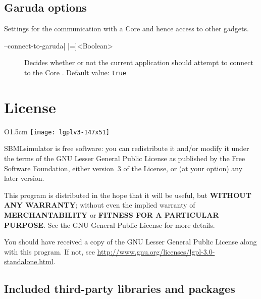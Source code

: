 \section{Garuda options}
Settings for the communication with a \Garuda Core and hence access to other \Garuda gadgets.
\begin{description}
\item[--connect-to-garuda{[} |={]}<Boolean>]
          Decides whether or not the current application should attempt
          to connect to the \Garuda Core \citep{Ghosh2011}.
          Default value: \texttt{true}
\end{description}
\renewcommand{\descriptionlabel}[1]{\textcolor{black}{\textbf{#1}}}

\chapter{License}

\begin{wrapfigure}{O}{1.5cm}
\vspace{\wrapfigspace}
\texttt{[image: lgplv3-147x51]}
\end{wrapfigure}
SBMLsimulator is free software: you can redistribute it and/or modify it under the terms of the GNU Lesser General Public License as published by the Free Software Foundation, either version~3 of the License, or (at your option) any later version.

This program is distributed in the hope that it will be useful, but \textbf{WITHOUT ANY WARRANTY}; without even the implied warranty of \textbf{MERCHANTABILITY} or \textbf{FITNESS FOR A PARTICULAR PURPOSE}. See the GNU General Public License for more details.

You should have received a copy of the GNU Lesser General Public License along with this program. If not, see \href{http://www.gnu.org/licenses/lgpl-3.0-standalone.html}{\url{http://www.gnu.org/licenses/lgpl-3.0-standalone.html}}.

\section{Included third-party libraries and packages}

